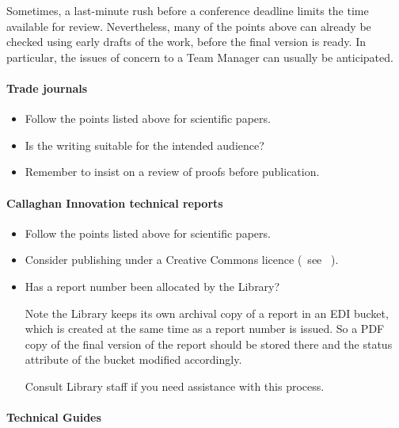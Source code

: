 Sometimes, a last-minute rush before a conference deadline limits the time available for review. Nevertheless, many of the points above can already be checked using early drafts of the work, before the final version is ready. In particular, the issues of concern to a Team Manager can usually be anticipated.

\paragraph{Trade journals}
\begin{itemize}
\item  Follow the points listed above for scientific papers.
\item  Is the writing suitable for the intended audience?
\item  Remember to insist on a review of proofs before publication.
\end{itemize} 

\paragraph{Callaghan Innovation technical reports}
\begin{itemize}
\item  Follow the points listed above for scientific papers.
\item  Consider publishing under a Creative Commons licence (~see \cite[\S\ref*{GRP-s_copyright}]{MSL_Reporting_Guidelines}~).
\item  Has a report number been allocated by the Library? 

\vspace{\baselineskip}
Note the Library keeps its own archival copy of a report in an EDI bucket, which is created at the same time as a report number is issued. So a PDF copy of the final version of the report should be stored there and the status attribute of the bucket modified accordingly. 

\vspace{\baselineskip}Consult Library staff if you need assistance with this process.
\end{itemize} 

\paragraph{Technical Guides}


